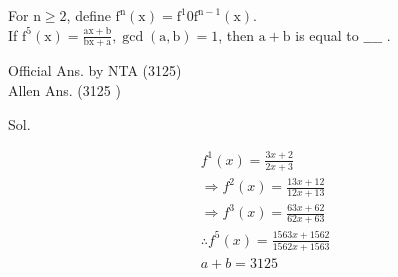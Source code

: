 \documentclass[10pt]{article}
\begin{document}
For \(\mathrm{n} \geq 2\), define \(\mathrm{f}^{\mathrm{n}}(\mathrm{x})=\mathrm{f}^{1} 0 \mathrm{f}^{\mathrm{n}-1}(\mathrm{x})\).\\
If \(\mathrm{f}^{5}(\mathrm{x})=\frac{\mathrm{ax}+\mathrm{b}}{\mathrm{bx}+\mathrm{a}}, \operatorname{gcd}(\mathrm{a}, \mathrm{b})=1\), then \(\mathrm{a}+\mathrm{b}\) is equal to \(\_\_\_\_\) .

Official Ans. by NTA (3125)\\
Allen Ans. (3125 )

Sol.

\[
\begin{aligned}
& f^{1}(x)=\frac{3 x+2}{2 x+3} \\
& \Rightarrow f^{2}(x)=\frac{13 x+12}{12 x+13} \\
& \Rightarrow f^{3}(x)=\frac{63 x+62}{62 x+63} \\
& \therefore f^{5}(x)=\frac{1563 x+1562}{1562 x+1563} \\
& a+b=3125
\end{aligned}
\]
\end{document}
